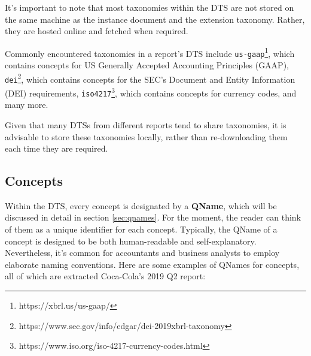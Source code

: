 
It's important to note that most taxonomies within the DTS are not stored on the same machine as the instance document and the extension taxonomy.
Rather, they are hosted online and fetched when required.

Commonly encountered taxonomies in a report's DTS include 
\texttt{us-gaap}\footnote{https://xbrl.us/us-gaap/}, which contains concepts for US Generally Accepted Accounting Principles (GAAP),
\texttt{dei}\footnote{https://www.sec.gov/info/edgar/dei-2019xbrl-taxonomy}, which contains concepts for the SEC's Document and Entity Information (DEI) requirements,
\texttt{iso4217}\footnote{https://www.iso.org/iso-4217-currency-codes.html}, which contains concepts for currency codes, 
and many more.




Given that many DTSs from different reports tend to share taxonomies, it is advisable to store these taxonomies locally,
rather than re-downloading them each time they are required.

\subsection{Concepts}

Within the DTS, every concept is designated by a \textbf{QName},
which will be discussed in detail in section \ref{sec:qnames}.
For the moment, the reader can think of them as a unique identifier for each concept.
Typically, the QName of a concept is designed to be both human-readable and self-explanatory.
Nevertheless, it's common for accountants and business analysts to employ elaborate naming conventions.
Here are some examples of QNames for concepts, all of which are extracted Coca-Cola's 2019 Q2 report\cite{ko2019q2}:

